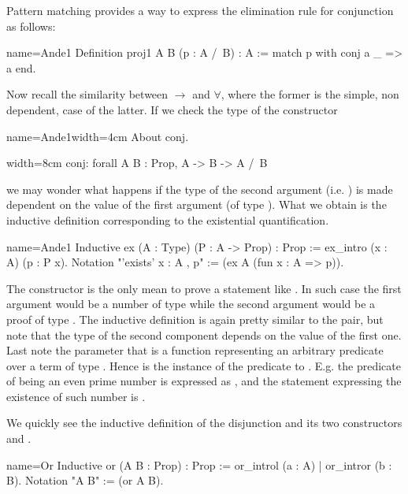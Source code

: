 Pattern matching provides a way to express the elimination rule for
conjunction as follows:

\begin{coq}{name=Ande1}{}
Definition proj1 A B (p : A /\ B) : A :=
  match p with conj a _ => a end.
\end{coq}

Now recall the similarity between $\to$ and $\forall$, where the former is the
simple, non dependent, case of the latter.  If we check the type of
the  constructor

\begin{coq}{name=Ande1}{width=4cm}
About conj.
\end{coq}
\begin{coqout}{}{width=8cm}
conj: forall A B : Prop, A -> B -> A /\ B
\end{coqout}
we may wonder what happens if the type of the second argument (i.e. ) is
made dependent on the value of the first argument (of type ).
What we obtain is the inductive definition corresponding to the
existential quantification.

\begin{coq}{name=Ande1}{}
Inductive ex (A : Type) (P : A -> Prop) : Prop :=
  ex_intro (x : A) (p : P x).
Notation "'exists' x : A , p" := (ex A (fun x : A => p)).
\end{coq}

The  constructor is the only mean to prove a statement like
.  In such case the first argument would be a number
 of type  while the second argument would be a proof  of type
.  The  inductive definition is again pretty similar to the
pair, but note that the type of the second component depends on the value of
the first one.  Last note the parameter  that is a function
representing an arbitrary predicate over a term of
type .  Hence  is the instance of the predicate to .  E.g.
the predicate of being an even prime number is expressed as
, and the statement expressing the
existence of such number is
.

We quickly see the inductive definition of the disjunction 
and its two constructors  and .

\begin{coq}{name=Or}{}
Inductive or (A B : Prop) : Prop := or_introl (a : A) | or_intror (b : B).
Notation "A \/ B" := (or A B).
\end{coq}

